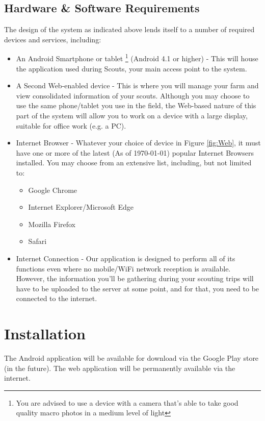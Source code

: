 \documentclass[11pt,a4paper,titlepage]{article}
\begin{document}
\subsection{Hardware \& Software Requirements}
The design of the system as indicated above lends itself to a number of required devices and services, including:
	\begin{itemize}
		\item An Android Smartphone or tablet \footnote{You are advised to use a device with a camera that's able to take good quality macro photos in a medium level of light} (Android 4.1 or higher) - This will house the application used during Scouts, your main access point to the system.
		\item A Second Web-enabled device - This is where you will manage your farm and view consolidated information of your scouts. Although you may choose to use the same phone/tablet you use in the field, the Web-based nature of this part of the system will allow you to work on a device with a large display, suitable for office work (e.g. a PC).
		\item Internet Browser - Whatever your choice of device in Figure \ref{fig:Web}, it must have one or more of the latest (As of \monthyeardate\today) popular Internet Browsers installed. You may choose from an extensive list, including, but not limited to:
		\begin{itemize}
			\item Google Chrome
			\item Internet Explorer/Microsoft Edge
			\item Mozilla Firefox
			\item Safari
		\end{itemize}
		\item Internet Connection - Our application is designed to perform all of its functions even where no mobile/WiFi network reception is available. However, the information you'll be gathering during your scouting trips will have to be uploaded to the server at some point, and for that, you need to be connected to the internet. 		
	\end{itemize}



\section{Installation}
The Android application will be available for download via the Google Play store (in the future). The web application will be permanently available via the internet.
		
\end{document}
